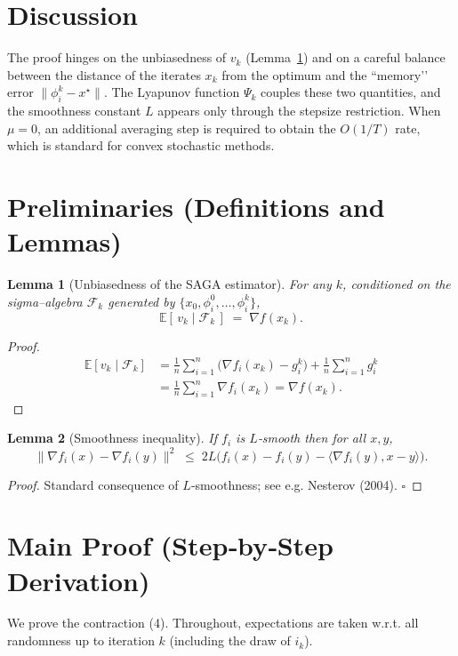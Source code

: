 \documentclass{article}
\newtheorem{lemma}{Lemma}
\begin{document}
\section*{Discussion}
The proof hinges on the unbiasedness of $v_k$ (Lemma~\ref{lem:unbiased}) and on a careful balance between the distance of the iterates $x_k$ from the optimum and the “memory’’ error $\|\phi_i^k-x^\star\|$. The Lyapunov function $\Psi_k$ couples these two quantities, and the smoothness constant $L$ appears only through the stepsize restriction. When $\mu=0$, an additional averaging step is required to obtain the $O(1/T)$ rate, which is standard for convex stochastic methods.

\section*{Preliminaries (Definitions and Lemmas)}
\begin{lemma}[Unbiasedness of the SAGA estimator]\label{lem:unbiased}
For any $k$, conditioned on the sigma–algebra $\mathcal{F}_k$ generated by $\{x_0,\phi_i^0,\dots,\phi_i^k\}$,
\[
\mathbb{E}[\,v_k\mid\mathcal{F}_k\,]\;=\;\nabla f(x_k).
\]
\end{lemma}
\begin{proof}
\[
\begin{aligned}
\mathbb{E}[v_k\mid\mathcal{F}_k]
&=\frac1n\sum_{i=1}^n\bigl(\nabla f_i(x_k)-g_i^k\bigr)
   +\frac1n\sum_{i=1}^n g_i^k \\
&=\frac1n\sum_{i=1}^n \nabla f_i(x_k) = \nabla f(x_k).
\end{aligned}
\]
\end{proof}

\begin{lemma}[Smoothness inequality]\label{lem:smooth}
If $f_i$ is $L$‑smooth then for all $x,y$,
\[
\|\nabla f_i(x)-\nabla f_i(y)\|^2 \;\le\; 2L\bigl(f_i(x)-f_i(y)-\langle\nabla f_i(y),x-y\rangle\bigr).
\]
\end{lemma}
\begin{proof}
Standard consequence of $L$‑smoothness; see e.g. Nesterov (2004). \hfill $\square$
\end{proof}

\section*{Main Proof (Step‑by‑Step Derivation)}
We prove the contraction (4). Throughout, expectations are taken w.r.t. all randomness up to iteration $k$ (including the draw of $i_k$).
\end{document}
